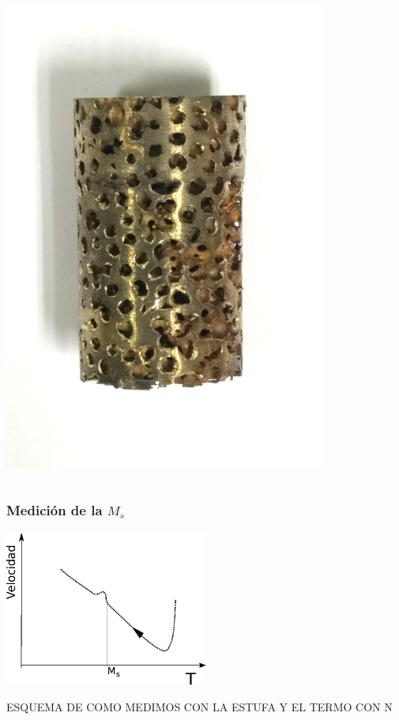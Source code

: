 \documentclass[usenames,dvipsnames]{beamer}
\begin{document}
\begin{frame}
\begin{center}
\begin{columns}
\includegraphics[width=0.8\textwidth]{img/proceso/proceso3.jpg}

\end{columns}

\end{center}
\end{frame}

\begin{frame}
\frametitle{Medición de la $M_s$}

 \includegraphics[width=0.5\textwidth]{img/proceso/Ms.eps}

 ESQUEMA DE COMO MEDIMOS CON LA ESTUFA Y EL TERMO CON N
 
\end{frame}
\end{document}
